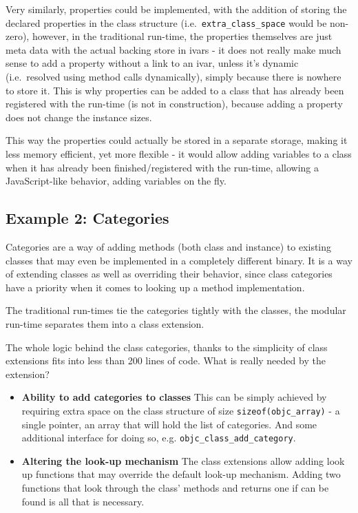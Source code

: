 Very similarly, properties could be implemented, with the addition of storing the declared properties in the class structure (i.e.\ \verb=extra_class_space= would be non-zero), however, in the traditional run-time, the properties themselves are just meta data with the actual backing store in ivars - it does not really make much sense to add a property without a link to an ivar, unless it's dynamic (i.e.\ resolved using method calls dynamically), simply because there is nowhere to store it. This is why properties can be added to a class that has already been registered with the run-time (is not in construction), because adding a property does not change the instance sizes.

This way the properties could actually be stored in a separate storage, making it less memory efficient, yet more flexible - it would allow adding variables to a class when it has already been finished/registered with the run-time, allowing a JavaScript-like behavior, adding variables on the fly.

\subsection{Example 2: Categories}\label{associated_objects_example_2}

Categories are a way of adding methods (both class and instance) to existing classes that may even be implemented in a completely different binary. It is a way of extending classes as well as overriding their behavior, since class categories have a priority when it comes to looking up a method implementation.

The traditional run-times tie the categories tightly with the classes, the modular run-time separates them into a class extension.

The whole logic behind the class categories, thanks to the simplicity of class extensions fits into less than 200 lines of code. What is really needed by the extension?

\begin{itemize}
  \item{\bf{Ability to add categories to classes}} This can be simply achieved by requiring extra space on the class structure of size \verb=sizeof(objc_array)= - a single pointer, an array that will hold the list of categories. And some additional interface for doing so, e.g. \verb=objc_class_add_category=.
  \item{\bf{Altering the look-up mechanism}} The class extensions allow adding look up functions that may override the default look-up mechanism. Adding two functions that look through the class' methods and returns one if can be found is all that is necessary.
\end{itemize}

